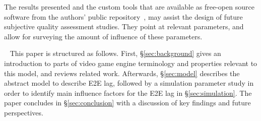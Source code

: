 The results presented and the custom tools that are available as free-open source software from the authors' public repository~\cite{onlinegame-lag-sim-repo}, may assist the design of future subjective quality assessment studies. They point at relevant parameters, and allow for surveying the amount of influence of these parameters.


~\newline
This paper is structured as follows. First, §\ref{sec:background} gives an introduction to parts of video game engine terminology and properties relevant to this model, %
and reviews related work.
Afterwards, §\ref{sec:model} describes the abstract model to describe \gls{E2E} lag, followed by a simulation parameter study in order to identify main influence factors for the \gls{E2E} lag in §\ref{sec:simulation}. The paper concludes in §\ref{sec:conclusion} with a discussion of key findings and future perspectives.





